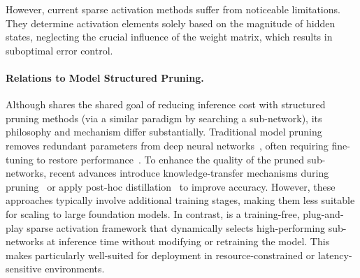 However, current sparse activation methods suffer from noticeable limitations. They determine activation elements solely based on the magnitude of hidden states, neglecting the crucial influence of the weight matrix, which results in suboptimal error control.

\paragraph{Relations to Model Structured Pruning.} Although \algacro{} shares the shared goal of reducing inference cost with structured pruning methods (via a similar paradigm by searching a sub-network), its philosophy and mechanism differ substantially. Traditional model pruning removes redundant parameters from deep neural networks~\citep{han2015deep, frankle2018lottery, frantar2023sparsegpt}, often requiring fine-tuning to restore performance~\citep{lin2019toward, he2018soft, wen2016learning, li2020group, zhuang2020neuron, chen2017reduced, chen2021orthant, chen2020neural}. To enhance the quality of the pruned sub-networks, recent advances introduce knowledge-transfer mechanisms during pruning~\citep{chen2021oto, chen2023otov2, chen2023otov3, chen2023lorashear, chen2024hesso,qu2025automatic} or apply post-hoc distillation~\citep{ko2024distillm, ko2025distillm} to improve accuracy. However, these approaches typically involve additional training stages, making them less suitable for scaling to large foundation models. In contrast, \algacro{} is a training-free, plug-and-play sparse activation framework that dynamically selects high-performing sub-networks at inference time without modifying or retraining the model. This makes \algacro{} particularly well-suited for deployment in resource-constrained or latency-sensitive environments.



